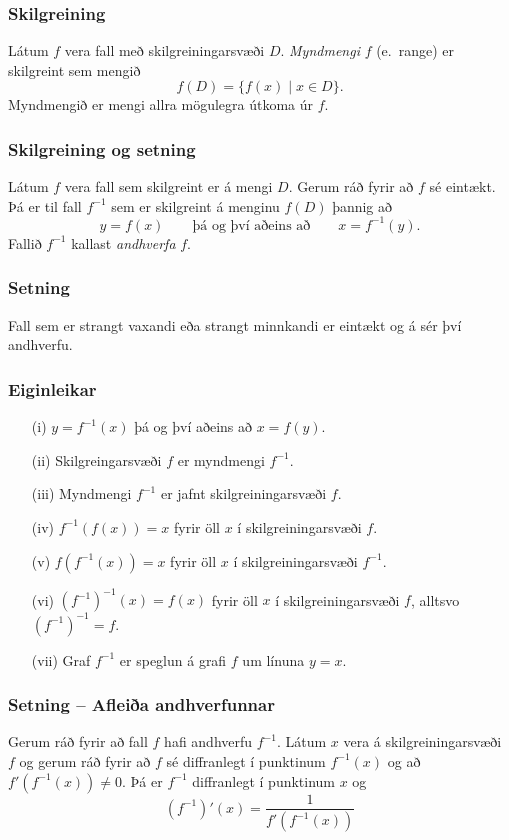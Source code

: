 \documentclass[icelandic,a4paper,12pt]{article}
\begin{document}
\subsubsection{Skilgreining}  Látum $f$ vera fall með skilgreiningarsvæði
$D$.  \emph{Myndmengi} $f$ (e.~range) er skilgreint sem mengið 
$$f(D)=\{f(x)\mid x\in D\}.$$
\pause
Myndmengið er mengi allra mögulegra útkoma úr $f$.

\subsubsection{Skilgreining og setning}
Látum $f$ vera fall sem skilgreint er á mengi $D$.  Gerum ráð fyrir að
$f$ sé eintækt.  Þá er til fall $f^{-1}$ sem er skilgreint á menginu
$f(D)$ þannig að $$y=f(x)\qquad\mbox{þá og því aðeins að}\qquad x=f^{-1}(y).$$
Fallið $f^{-1}$ kallast \emph{andhverfa} $f$.

\subsubsection{Setning}  
Fall sem er strangt vaxandi eða strangt minnkandi er eintækt og á sér því andhverfu.

\subsubsection{Eiginleikar}
\begin{itemize}
\item[(i)]  $y=f^{-1}(x)$ þá og því aðeins að $x=f(y)$.
\pause
\item[(ii)]  Skilgreingarsvæði $f$ er myndmengi $f^{-1}$.
\pause
\item[(iii)]  Myndmengi $f^{-1}$ er jafnt skilgreiningarsvæði $f$.
\pause
\item[(iv)]  $f^{-1}(f(x))=x$ fyrir öll $x$ í skilgreiningarsvæði $f$.
\pause
\item[(v)]  $f(f^{-1}(x))=x$ fyrir öll $x$ í skilgreiningarsvæði  $f^{-1}$.
\pause
\item[(vi)]  $(f^{-1})^{-1}(x)=f(x)$ fyrir öll $x$ í
  skilgreiningarsvæði $f$, alltsvo $(f^{-1})^{-1}=f$.
\pause
\item[(vii)]  Graf $f^{-1}$ er speglun á grafi $f$ um línuna $y=x$.
\end{itemize}

\subsubsection{Setning -- Afleiða andhverfunnar}
Gerum ráð fyrir að fall $f$ hafi andhverfu $f^{-1}$.  Látum $x$ vera á
skilgreiningarsvæði $f$ og gerum ráð fyrir að $f$ sé diffranlegt í
punktinum $f^{-1}(x)$ og að $f'(f^{-1}(x))\neq 0$.  Þá er $f^{-1}$
diffranlegt í punktinum $x$ og 
\begin{equation*}
\left(f^{-1}\right)'(x)=\frac{1}{f'(f^{-1}(x))}
\end{equation*}
\end{document}
